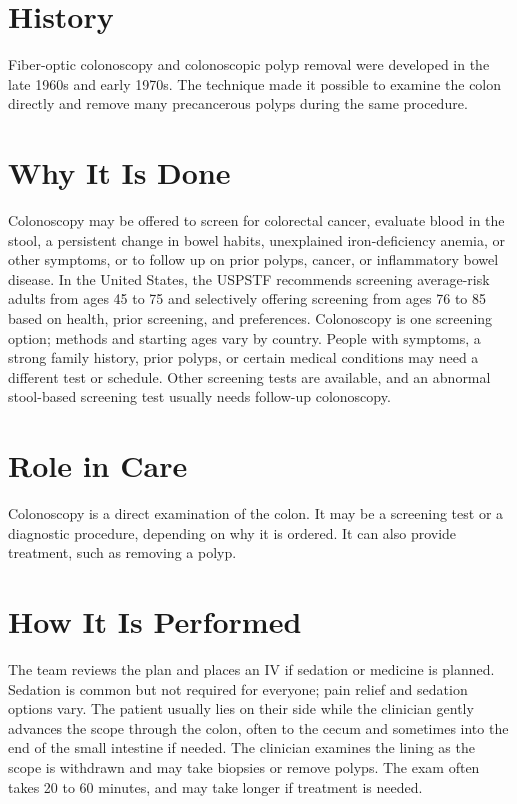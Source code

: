 \section*{History}
Fiber-optic colonoscopy and colonoscopic polyp removal were developed in the late 1960s and early 1970s. The technique made it possible to examine the colon directly and remove many precancerous polyps during the same procedure.

\section*{Why It Is Done}
Colonoscopy may be offered to screen for colorectal cancer, evaluate blood in the stool, a persistent change in bowel habits, unexplained iron-deficiency anemia, or other symptoms, or to follow up on prior polyps, cancer, or inflammatory bowel disease. In the United States, the USPSTF recommends screening average-risk adults from ages 45 to 75 and selectively offering screening from ages 76 to 85 based on health, prior screening, and preferences. Colonoscopy is one screening option; methods and starting ages vary by country. People with symptoms, a strong family history, prior polyps, or certain medical conditions may need a different test or schedule. Other screening tests are available, and an abnormal stool-based screening test usually needs follow-up colonoscopy.

\section*{Role in Care}
Colonoscopy is a direct examination of the colon. It may be a screening test or a diagnostic procedure, depending on why it is ordered. It can also provide treatment, such as removing a polyp.

\section*{How It Is Performed}
The team reviews the plan and places an IV if sedation or medicine is planned. Sedation is common but not required for everyone; pain relief and sedation options vary. The patient usually lies on their side while the clinician gently advances the scope through the colon, often to the cecum and sometimes into the end of the small intestine if needed. The clinician examines the lining as the scope is withdrawn and may take biopsies or remove polyps. The exam often takes 20 to 60 minutes, and may take longer if treatment is needed.

